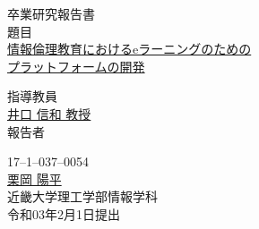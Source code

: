 
\begin{center}
\vspace*{1cm}
\large
{\LARGE 卒業研究報告書}\\
\vspace*{0.8cm}
題目\\
\vspace*{1cm}
{\Huge \underline{情報倫理教育におけるeラーニングのための}}\\
{\Huge \underline{プラットフォームの開発}}\\
\vspace{3mm}

\vspace*{3cm}
指導教員\\
\vspace*{0.3cm}
\underline{\LARGE 井口 信和 教授}\\
\vspace*{3cm}
報告者\\
\vspace*{0.3cm}

{17--1--037--0054}\\
\vspace*{0.3cm}
\underline{\Huge 栗岡 陽平}\\
\vspace*{0.5cm}
近畿大学理工学部情報学科\\
\vspace*{2cm}
令和03年2月1日提出\\
\end{center}
 

